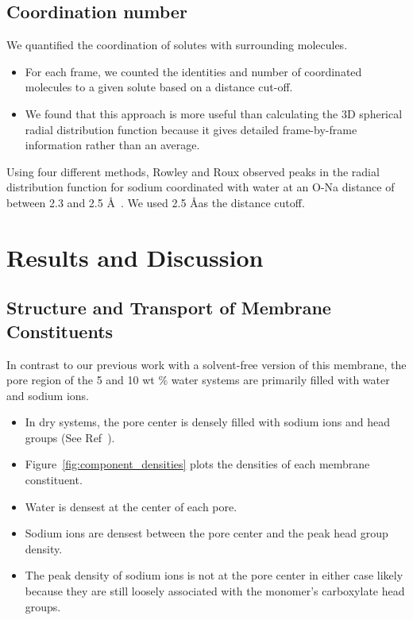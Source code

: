 \documentclass{article}
\begin{document}
  \subsection*{Coordination number}

  We quantified the coordination of solutes with surrounding molecules.
  \begin{itemize}
  	\item For each frame, we counted the identities and number of
  	coordinated molecules to a given solute based on a distance cut-off. 
	\item We found that this approach is more useful than calculating the
	3D spherical radial distribution function because it gives detailed
	frame-by-frame information rather than an average. 
  \end{itemize}
  
  Using four different methods, Rowley and Roux observed peaks in the radial
  distribution function for sodium coordinated with water at an O-Na distance 
  of between 2.3 and 2.5 \AA~\cite{rowley_solvation_2012}. We used 2.5 \AA as
  the distance cutoff.  %
   
  \section{Results and Discussion}
  
  \subsection*{Structure and Transport of Membrane Constituents}\label{section:membrane_components}
  
  
  In contrast to our previous work with a solvent-free version of this membrane, the pore
  region of the 5 and 10 wt \% water systems are primarily filled with water and sodium
  ions.
  \begin{itemize}
    \item In dry systems, the pore center is densely filled with sodium ions and 
    head groups (See Ref~\cite{coscia_understanding_2019}).
    \item Figure~\ref{fig:component_densities} plots the densities of each
    membrane constituent.
    \item Water is densest at the center of each pore. 
    \item Sodium ions are densest between the pore center and the peak head group density.
    \item The peak density of sodium ions is not at the pore center in either case
    likely because they are still loosely associated with the monomer's 
    carboxylate head groups.
  \end{itemize}
  
\end{document}
